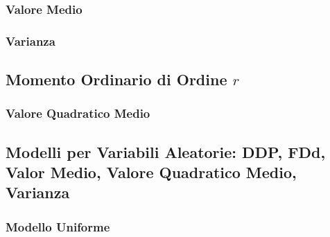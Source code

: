 \documentclass[12pt,oneside,openany]{memoir}
\numberwithin{equation}{subsection}
\begin{document}
\subsubsection{Valore Medio}


\subsubsection{Varianza}


\subsection{Momento Ordinario di Ordine $r$}


\subsubsection{Valore Quadratico Medio}


\newpage
\subsection{Modelli per Variabili Aleatorie: DDP, FDd, Valor Medio, Valore
Quadratico Medio, Varianza}


\subsubsection{Modello Uniforme}
\end{document}
